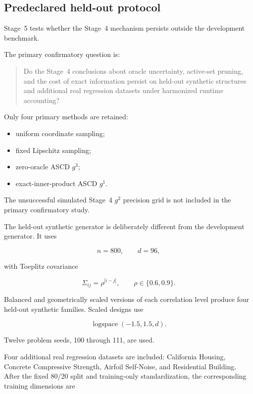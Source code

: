 \documentclass[11pt]{article}
\begin{document}
\subsection{Predeclared held-out protocol}

Stage~5 tests whether the Stage~4 mechanism persists outside the
development benchmark.

The primary confirmatory question is:

\begin{quote}
Do the Stage~4 conclusions about oracle uncertainty, active-set pruning,
and the cost of exact information persist on held-out synthetic
structures and additional real regression datasets under harmonized
runtime accounting?
\end{quote}

Only four primary methods are retained:

\begin{itemize}
    \item uniform coordinate sampling;
    \item fixed Lipschitz sampling;
    \item zero-oracle ASCD $g^3$;
    \item exact-inner-product ASCD $g^1$.
\end{itemize}

The unsuccessful simulated Stage~4 $g^2$ precision grid is not included
in the primary confirmatory study.

The held-out synthetic generator is deliberately different from the
development generator. It uses

\[
n=800,
\qquad
d=96,
\]

with Toeplitz covariance

\begin{equation}
\Sigma_{ij}
=
\rho^{|i-j|},
\qquad
\rho\in\{0.6,0.9\}.
\label{eq:toeplitz}
\end{equation}

Balanced and geometrically scaled versions of each correlation level
produce four held-out synthetic families. Scaled designs use

\[
\operatorname{logspace}(-1.5,1.5,d).
\]

Twelve problem seeds, 100 through 111, are used.

Four additional real regression datasets are included:
California Housing, Concrete Compressive Strength, Airfoil Self-Noise,
and Residential Building. After the fixed 80/20 split and training-only
standardization, the corresponding training dimensions are
\end{document}

